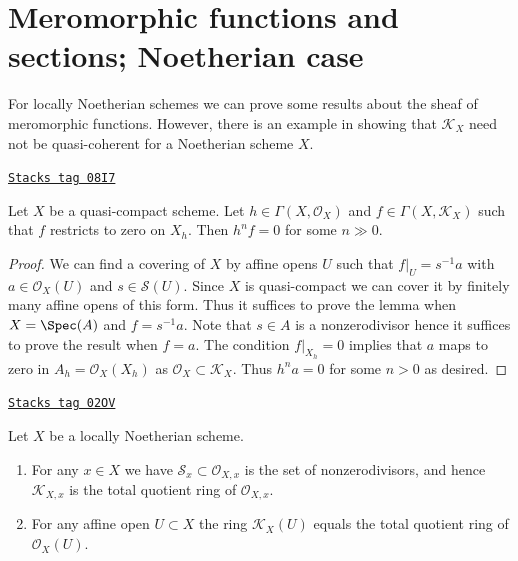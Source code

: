 \section{Meromorphic functions and sections; Noetherian case}
\label{divisors-section-meromorphic-noetherian}
For locally Noetherian schemes we can prove some results about the
sheaf of meromorphic functions. However, there is an example in
\cite{misconceptions} showing that $\mathcal{K}_X$ need not be quasi-coherent
for a Noetherian scheme $X$.

\begin{lemma}
\label{divisors-lemma-meromorphic-section-restricts-to-zero}
\href{https://stacks.math.columbia.edu/tag/08I7}{\texttt{Stacks tag 08I7}}

Let $X$ be a quasi-compact scheme. Let $h \in \Gamma(X, \mathcal{O}_X)$ and
$f \in \Gamma(X, \mathcal{K}_X)$ such that $f$ restricts
to zero on $X_h$. Then $h^n f = 0$ for some $n \gg 0$.
\end{lemma}

\begin{proof}
We can find a covering of $X$ by affine opens $U$ such that $f|_U = s^{-1}a$
with $a \in \mathcal{O}_X(U)$ and $s \in \mathcal{S}(U)$. Since $X$ is
quasi-compact we can cover it by finitely many affine opens of this form.
Thus it suffices to prove the lemma when $X = \Spec(A)$ and $f = s^{-1}a$.
Note that $s \in A$ is a nonzerodivisor hence it suffices to prove
the result when $f = a$. The condition $f|_{X_h} = 0$ implies that
$a$ maps to zero in $A_h = \mathcal{O}_X(X_h)$ as
$\mathcal{O}_X \subset \mathcal{K}_X$. Thus $h^na = 0$ for some $n > 0$
as desired.
\end{proof}

\begin{lemma}
\label{divisors-lemma-locally-Noetherian-K}
\href{https://stacks.math.columbia.edu/tag/02OV}{\texttt{Stacks tag 02OV}}

Let $X$ be a locally Noetherian scheme.
\begin{enumerate}
\item For any $x \in X$ we have $\mathcal{S}_x \subset \mathcal{O}_{X, x}$
is the set of nonzerodivisors, and hence $\mathcal{K}_{X, x}$
is the total quotient ring of $\mathcal{O}_{X, x}$.
\item For any affine open $U \subset X$ the ring
$\mathcal{K}_X(U)$ equals the total quotient ring of $\mathcal{O}_X(U)$.
\end{enumerate}
\end{lemma}

